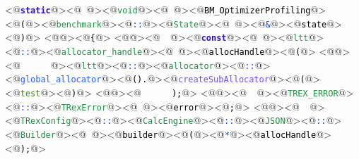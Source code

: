 <@\textcolor[HTML]{3010CF}{\textbf{\texttt{static}}}@><@\textcolor[HTML]{000000}{\texttt{\ }}@><@\textcolor[HTML]{1F8F42}{\texttt{void}}@><@\textcolor[HTML]{000000}{\texttt{\ }}@><@\textcolor[HTML]{000000}{\texttt{BM\_OptimizerProfiling}}@><@\textcolor[HTML]{000000}{\texttt{(}}@><@\textcolor[HTML]{1F8F42}{\texttt{benchmark}}@><@\textcolor[HTML]{1041FF}{\texttt{::}}@><@\textcolor[HTML]{1F8F42}{\texttt{State}}@><@\textcolor[HTML]{000000}{\texttt{\ }}@><@\textcolor[HTML]{1041FF}{\texttt{\&}}@><@\textcolor[HTML]{000000}{\texttt{state}}@><@\textcolor[HTML]{000000}{\texttt{)}}@>
<@\textcolor[HTML]{000000}{\texttt{}}@><@\textcolor[HTML]{000000}{\texttt{\{}}@>
<@\textcolor[HTML]{000000}{\texttt{}}@><@\textcolor[HTML]{000000}{\texttt{\ \ }}@><@\textcolor[HTML]{3010CF}{\textbf{\texttt{const}}}@><@\textcolor[HTML]{000000}{\texttt{\ }}@><@\textcolor[HTML]{1F8F42}{\texttt{ltt}}@><@\textcolor[HTML]{1041FF}{\texttt{::}}@><@\textcolor[HTML]{1F8F42}{\texttt{allocator\_handle}}@><@\textcolor[HTML]{000000}{\texttt{\ }}@><@\textcolor[HTML]{000000}{\texttt{allocHandle}}@><@\textcolor[HTML]{000000}{\texttt{(}}@>
<@\textcolor[HTML]{000000}{\texttt{}}@><@\textcolor[HTML]{000000}{\texttt{\ \ \ \ \ \ }}@><@\textcolor[HTML]{1F8F42}{\texttt{ltt}}@><@\textcolor[HTML]{1041FF}{\texttt{::}}@><@\textcolor[HTML]{1F8F42}{\texttt{allocator}}@><@\textcolor[HTML]{1041FF}{\texttt{::}}@><@\textcolor[HTML]{255CFF}{\texttt{global\_allocator}}@><@\textcolor[HTML]{000000}{\texttt{().}}@><@\textcolor[HTML]{724BFF}{\texttt{createSubAllocator}}@><@\textcolor[HTML]{000000}{\texttt{(}}@><@\textcolor[HTML]{418310}{\texttt{\dq{}test\dq{}}}@><@\textcolor[HTML]{000000}{\texttt{)}}@>
<@\textcolor[HTML]{000000}{\texttt{}}@><@\textcolor[HTML]{000000}{\texttt{\ \ \ \ \ \ );}}@>
<@\textcolor[HTML]{000000}{\texttt{}}@><@\textcolor[HTML]{000000}{\texttt{\ \ }}@><@\textcolor[HTML]{1F8F42}{\texttt{TREX\_ERROR}}@><@\textcolor[HTML]{1041FF}{\texttt{::}}@><@\textcolor[HTML]{1F8F42}{\texttt{TRexError}}@><@\textcolor[HTML]{000000}{\texttt{\ }}@><@\textcolor[HTML]{000000}{\texttt{error}}@><@\textcolor[HTML]{000000}{\texttt{;}}@>
<@\textcolor[HTML]{000000}{\texttt{}}@><@\textcolor[HTML]{000000}{\texttt{\ \ }}@><@\textcolor[HTML]{1F8F42}{\texttt{TRexConfig}}@><@\textcolor[HTML]{1041FF}{\texttt{::}}@><@\textcolor[HTML]{1F8F42}{\texttt{CalcEngine}}@><@\textcolor[HTML]{1041FF}{\texttt{::}}@><@\textcolor[HTML]{1F8F42}{\texttt{JSON}}@><@\textcolor[HTML]{1041FF}{\texttt{::}}@><@\textcolor[HTML]{1F8F42}{\texttt{Builder}}@><@\textcolor[HTML]{000000}{\texttt{\ }}@><@\textcolor[HTML]{000000}{\texttt{builder}}@><@\textcolor[HTML]{000000}{\texttt{(}}@><@\textcolor[HTML]{1041FF}{\texttt{*}}@><@\textcolor[HTML]{000000}{\texttt{allocHandle}}@><@\textcolor[HTML]{000000}{\texttt{);}}@>
